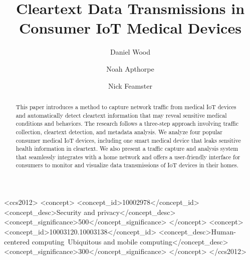 \documentclass[sigconf]{acmart}
\begin{document}
\title{Cleartext Data Transmissions in Consumer IoT Medical Devices}


\author{Daniel Wood}

\author{Noah Apthorpe}

\author{Nick Feamster}


\renewcommand{\shortauthors}{D. Wood et al.}

\begin{abstract}
This paper introduces a method to
capture network traffic from medical IoT devices and automatically detect cleartext
information that may reveal sensitive medical conditions and behaviors. 
The research follows a three-step approach involving traffic collection, cleartext detection,
and metadata analysis. 
We analyze four popular consumer medical IoT devices, 
including one smart medical device that leaks sensitive
health information in cleartext. 
We also present a traffic capture and analysis system that seamlessly integrates
with a home network and offers
a user-friendly interface for consumers to monitor and visualize data transmissions
of IoT devices in their homes. 

\end{abstract}

%
%
\begin{CCSXML}
<ccs2012>
<concept>
<concept_id>10002978</concept_id>
<concept_desc>Security and privacy</concept_desc>
<concept_significance>500</concept_significance>
</concept>
<concept>
<concept_id>10003120.10003138</concept_id>
<concept_desc>Human-centered computing~Ubiquitous and mobile computing</concept_desc>
<concept_significance>300</concept_significance>
</concept>
</ccs2012>
\end{CCSXML}
\end{document}

